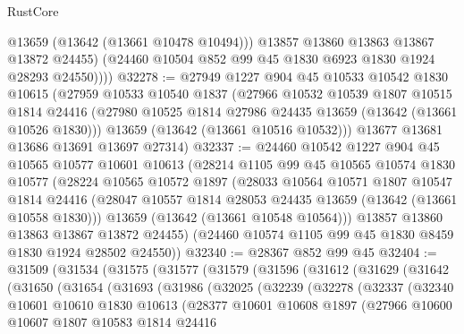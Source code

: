 \begin{lexlean}{RustCore}
\begin{coremodule}
              @13659
              (@13642 (@13661 @10478 @10494)))
            @13857
            @13860
            @13863
            @13867
            @13872
            @24455)
          (@24460 @10504 @852 @99 @45 @1830 @6923 @1830 @1924 @28293 @24550))))
@32278 := @27949
    @1227
    @904
    @45
    @10533
    @10542
    @1830
    @10615
    (@27959
      @10533
      @10540
      @1837
      (@27966
        @10532
        @10539
        @1807
        @10515
        @1814
        @24416
        (@27980 @10525 @1814 @27986 @24435 @13659 (@13642 (@13661 @10526 @1830)))
        @13659
        (@13642 (@13661 @10516 @10532)))
      @13677
      @13681
      @13686
      @13691
      @13697
      @27314)
@32337 := @24460
    @10542
    @1227
    @904
    @45
    @10565
    @10577
    @10601
    @10613
    (@28214
      @1105
      @99
      @45
      @10565
      @10574
      @1830
      @10577
      (@28224
        @10565
        @10572
        @1897
        (@28033
          @10564
          @10571
          @1807
          @10547
          @1814
          @24416
          (@28047 @10557 @1814 @28053 @24435 @13659 (@13642 (@13661 @10558 @1830)))
          @13659
          (@13642 (@13661 @10548 @10564)))
        @13857
        @13860
        @13863
        @13867
        @13872
        @24455)
      (@24460 @10574 @1105 @99 @45 @1830 @8459 @1830 @1924 @28502 @24550))
@32340 := @28367 @852 @99 @45
@32404 := @31509
    (@31534
      (@31575
        (@31577
          (@31579
            (@31596
              (@31612
                (@31629
                  (@31642
                    (@31650
                      (@31654
                        (@31693
                          (@31986
                            (@32025
                              (@32239
                                (@32278
                                  (@32337
                                    (@32340
                                      @10601
                                      @10610
                                      @1830
                                      @10613
                                      (@28377
                                        @10601
                                        @10608
                                        @1897
                                        (@27966
                                          @10600
                                          @10607
                                          @1807
                                          @10583
                                          @1814
                                          @24416

\end{coremodule}
\end{lexlean}
